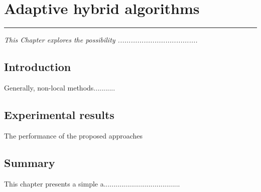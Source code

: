 \chapter{Adaptive hybrid algorithms}
\label{C6} %
\graphicspath{{Figures/Chapter-6figs/PDF/}{Figures/Chapter-6figs/}}
\noindent\rule{\linewidth}{2pt}
\textit{This Chapter explores the possibility .....................................}
\section{Introduction} \label{S6.1}
Generally, non-local methods...........
\section{Experimental results} \label{S6.4}
 The performance of the proposed approaches 
\section{Summary}
This chapter presents a simple a.......................................